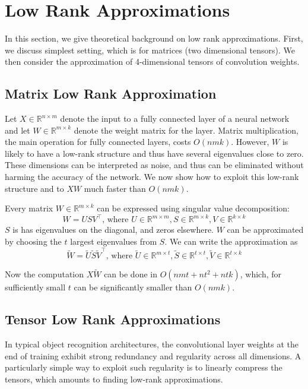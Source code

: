 \section{Low Rank Approximations}
In this section, we give theoretical background on low rank approximations. First, we discuss simplest setting, which is
for matrices (two dimensional tensors). We then consider the approximation of 4-dimensional tensors of convolution weights.


\subsection{Matrix Low Rank Approximation}
Let $X \in \mathbb{R}^{n \times m}$ denote the input to a fully connected layer of a neural network and let $W \in \mathbb{R}^{m \times k}$ denote the weight matrix for the layer. Matrix multiplication,  the main operation for fully connected layers, costs $O(nmk)$. However, $W$ is likely to have a low-rank structure and thus have several eigenvalues close to zero. These dimensions can be interpreted as noise, and thus can be eliminated without harming the accuracy of the network. We now show how to exploit this low-rank structure and to $XW$ much faster than $O(nmk)$. 


Every matrix $W \in \mathbb{R}^{m \times k}$ can be expressed using singular value decomposition:
\begin{equation*}
	W = USV^{\top}\text{, where }U \in \mathbb{R}^{m \times m}, S \in \mathbb{R}^{m \times k}, V \in \mathbb{R}^{k \times k}
\end{equation*}
$S$ is has eigenvalues on the diagonal, and zeros elsewhere. $W$ can be approximated by choosing the $t$ largest 
eigenvalues from $S$. We can write the approximation as
\begin{equation*}
	\tilde{W} = \tilde{U}\tilde{S}\tilde{V}^{\top}\text{, where }\tilde{U} \in \mathbb{R}^{m \times t}, \tilde{S} \in \mathbb{R}^{t \times t}, \tilde{V} \in \mathbb{R}^{t \times k}
\end{equation*}

Now the computation $X\tilde{W}$ can be done in $O(nmt + nt^2 + ntk)$, which, for sufficiently small $t$ can be significantly smaller than $O(nmk)$. 

\subsection{Tensor Low Rank Approximations}

In typical object recognition architectures, the convolutional layer weights at the end of training exhibit strong redundancy and regularity across all dimensions. A particularly simple way to exploit such regularity is to 
linearly compress the tensors, which amounts to finding low-rank approximations.

